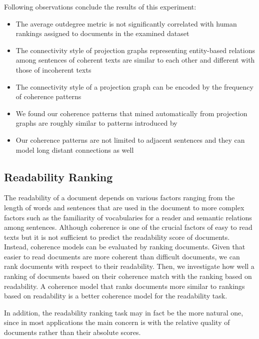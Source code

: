 Following observations conclude the results of this experiment:

\begin{itemize}
	\item The average outdegree metric is not significantly correlated with human rankings assigned to documents in the examined dataset 

	\item The connectivity style of projection graphs representing entity-based relations among sentences of coherent texts are similar to each other and different with those of incoherent texts

	\item The connectivity style of a projection graph can be encoded by the frequency of coherence patterns 

	\item We found our coherence patterns that mined automatically from projection graphs are roughly similar to patterns introduced by 

	\item Our coherence patterns are not limited to adjacent sentences and they can model long distant connections as well 

\end{itemize}


\subsection{Readability Ranking} 
\label{subsec:Readability Ranking}
%
The readability of a document depends on various factors ranging from the length of words and sentences that are used in the document to more complex factors such as the familiarity of vocabularies for a reader and semantic relations among sentences. 
Although coherence is one of the crucial factors of easy to read texts but it is not sufficient to predict the readability score of documents. 
Instead, coherence models can be evaluated by ranking documents. 
Given that easier to read documents are more coherent than difficult documents, we can rank documents with respect to their readability. 
Then, we investigate how well a ranking of documents based on their coherence match with the ranking based on readability. 
A coherence model that ranks documents more similar to rankings based on readability is a better coherence model for the readability task. 

In addition, the readability ranking task may in fact be the more natural one, since in most applications the main concern is with the relative quality of documents rather than their absolute scores. 


